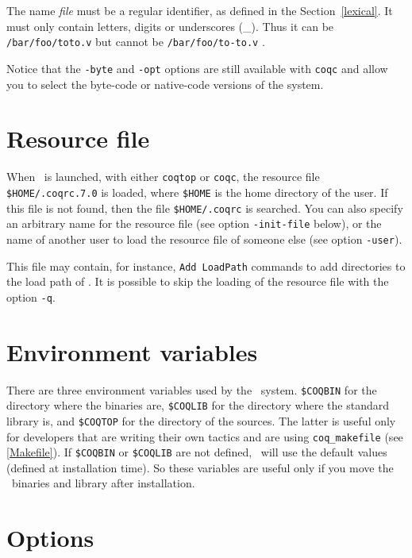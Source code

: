 \Warning The name {\em file} must be a regular {\Coq} identifier, as
defined in the Section~\ref{lexical}. It
must only contain letters, digits or underscores
(\_). Thus it can be \verb+/bar/foo/toto.v+ but cannot be
\verb+/bar/foo/to-to.v+ . 

Notice that the \verb!-byte! and \verb!-opt! options are still
available with \verb!coqc!  and allow you to select the byte-code or
native-code versions of the system.


\section[Resource file]{Resource file}

When \Coq\ is launched, with either {\tt coqtop} or {\tt coqc}, the
resource file \verb:$HOME/.coqrc.7.0: is loaded, where \verb:$HOME: is
the home directory of the user.  If this file is not found, then the
file \verb:$HOME/.coqrc: is searched. You can also specify an
arbitrary name for the resource file (see option \verb:-init-file:
below), or the name of another user to load the resource file of
someone else (see option \verb:-user:).

This file may contain, for instance, \verb:Add LoadPath: commands to add
directories to the load path of \Coq.
It is possible to skip the loading of the resource file with the
option \verb:-q:.

\section[Environment variables]{Environment variables\label{EnvVariables}
}

There are three environment variables used by the \Coq\ system.
\verb:$COQBIN: for the directory where the binaries are,
\verb:$COQLIB: for the directory where the standard library is, and 
\verb:$COQTOP: for the directory of the sources. The latter is useful
only for developers that are writing their own tactics and are using
\texttt{coq\_makefile} (see \ref{Makefile}). If \verb:$COQBIN: or
\verb:$COQLIB: are not defined, \Coq\ will use the default values
(defined at installation time). So these variables are useful only if
you move the \Coq\ binaries and library after installation.

\section[Options]{Options
\label{vmoption}
\label{coqoptions}}

